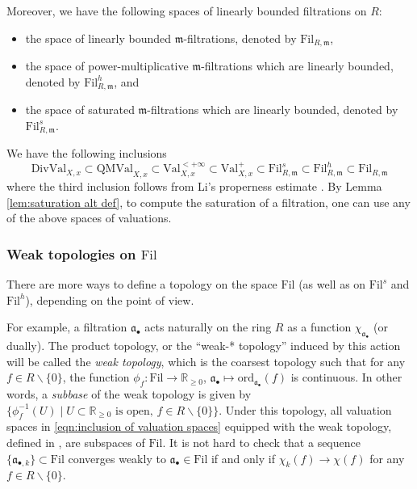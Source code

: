 \documentclass[11pt, leqno]{amsart}%
\theoremstyle{plain}
\theoremstyle{definition}
\theoremstyle{remark}
\newcommand{\bR}{\mathbb{R}}
\newcommand{\fa}{\mathfrak{a}}
\newcommand{\fm}{\mathfrak{m}}
\newcommand{\ord}{\mathrm{ord}}
\newcommand{\Val}{\mathrm{Val}}
\newcommand{\DivVal}{\mathrm{DivVal}}
\newcommand{\QMVal}{\mathrm{QMVal}}
\newcommand{\Fil}{\mathrm{Fil}}
\numberwithin{equation}{section}
\begin{document}
Moreover, we have the following spaces of linearly bounded filtrations on $R$:

\begin{itemize}
    \item the space of linearly bounded $\fm$-filtrations, denoted by $\Fil_{R,\fm}$,
	
    \item the space of power-multiplicative $\fm$-filtrations which are linearly bounded, denoted by $\Fil^h_{R,\fm}$, and
	
    \item the space of saturated $\fm$-filtrations which are linearly bounded, denoted by $\Fil^s_{R,\fm}$.
\end{itemize}

We have the following inclusions
\begin{equation}\label{eqn:inclusion of valuation spaces}
\DivVal_{X,x}\subset\QMVal_{X,x}\subset
\Val^{<+\infty}_{X,x}\subset\Val^+_{X,x}\subset \Fil^s_{R,\fm}\subset \Fil^h_{R,\fm}\subset \Fil_{R,\fm}
\end{equation}
where the third inclusion follows from Li's properness estimate \cite[Theorem 1.4]{Li18}. %
By Lemma \ref{lem:saturation alt def}, to compute the saturation of a filtration, one can use any of the above spaces of valuations. 



\subsubsection{Weak topologies on $\Fil$}\label{sssec:weak topologies}

There are more ways to define a topology on the space $\Fil$ (as well as on $\Fil^s$ and $\Fil^h$), depending on the point of view. %

For example, a filtration $\fa_\bullet$ acts naturally on the ring $R$ as a function $\chi_{\fa_\bullet}$ (or dually). The product topology, or the ``weak-* topology'' induced by this action will be called the \emph{weak topology}, which is the coarsest topology such that for any $f\in R\backslash\{0\}$, the function $\phi_f:\Fil\to \bR_{\ge 0}$, $\fa_\bullet\mapsto \ord_{\fa_\bullet}(f)$ is continuous. In other words, a \emph{subbase} of the weak topology is given by $\{\phi_f^{-1}(U)\mid U\subset \bR_{\ge 0} \text{ is open, } f\in R\backslash\{0\}\}$.  Under this topology, all valuation spaces in \eqref{eqn:inclusion of valuation spaces} equipped with the weak topology, defined in \cite{JM12}, are subspaces of $\Fil$. It is not hard to check that a sequence $\{\fa_{\bullet,k}\}\subset\Fil$ converges weakly to $\fa_\bullet\in\Fil$ if and only if $\chi_k(f)\to\chi(f)$ for any $f\in R\backslash\{0\}$.
\end{document}
